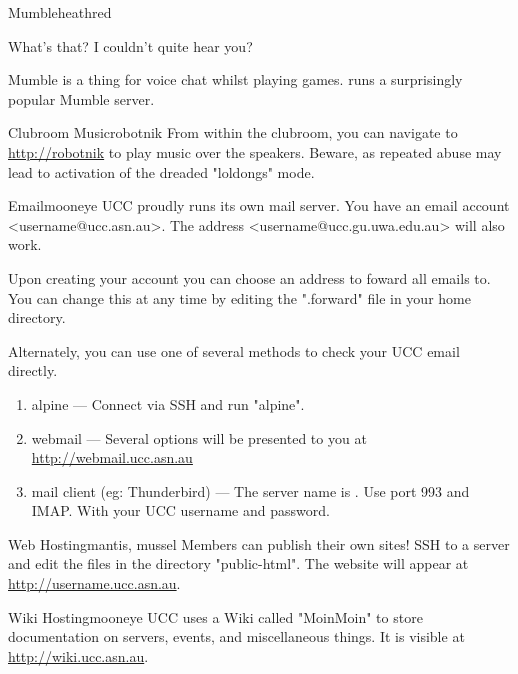 \begin{uccservice}{Mumble}{heathred}

What's that? I couldn't quite hear you?

Mumble is a thing for voice chat whilst playing games.  runs a surprisingly popular Mumble server.

\end{uccservice}

\begin{uccservice}{Clubroom Music}{robotnik}
From within the clubroom, you can navigate to \url{http://robotnik} to play music over the speakers. Beware, as repeated abuse may lead to activation of the dreaded "loldongs" mode.
\end{uccservice}

\begin{uccservice}{Email}{mooneye}
UCC proudly runs its own mail server. You have an email account <username@ucc.asn.au>. The address <username@ucc.gu.uwa.edu.au> will also work.

Upon creating your account you can choose an address to foward all emails to. You can change this at any time by editing the ".forward" file in your home directory.

Alternately, you can use one of several methods to check your UCC email directly.
\begin{enumerate}
	\item alpine --- Connect via SSH and run "alpine".
	\item webmail --- Several options will be presented to you at \url{http://webmail.ucc.asn.au}
	\item mail client (eg: Thunderbird) --- The server name is . Use port 993 and IMAP. With your UCC username and password.
\end{enumerate}

\end{uccservice}

\begin{uccservice}{Web Hosting}{mantis, mussel}
Members can publish their own sites! SSH to a server and edit the files in the directory "public-html". The website will appear at \url{http://username.ucc.asn.au}.
\end{uccservice}

\begin{uccservice}{Wiki Hosting}{mooneye}
UCC uses a Wiki called "MoinMoin" to store documentation on servers, events, and miscellaneous things. It is visible at \url{http://wiki.ucc.asn.au}.
\end{uccservice}

